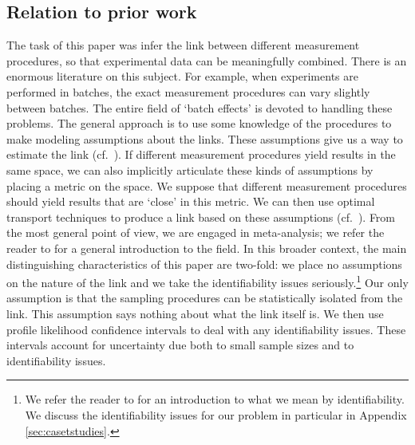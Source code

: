 \begin{itemize}
\section{Relation to prior work}

The task of this paper was infer the link between different measurement procedures, so that experimental data can be meaningfully combined.  There is an enormous literature on this subject.  For example, when experiments are performed in batches, the exact measurement procedures can vary slightly between batches.  The entire field of `batch effects' is devoted to handling these problems.  The general approach is to use some knowledge of the procedures to make modeling assumptions about the links.  These assumptions give us a way to estimate the link (cf.\ \cite{johnson2007adjusting}).  If different measurement procedures yield results in the same space, we can also implicitly articulate these kinds of assumptions by placing a metric on the space.  We suppose that different measurement procedures should yield results that are `close' in this metric.  We can then use optimal transport techniques to produce a link based on these assumptions (cf.\ \cite{tabak2018explanation}).  From the most general point of view, we are engaged in meta-analysis; we refer the reader to \cite{borenstein2011introduction} for a general introduction to the field.  In this broader context, the main distinguishing characteristics of this paper are two-fold: we place no assumptions on the nature of the link and we take the identifiability issues seriously.\footnote{We refer the reader to \cite{walter2014identifiability} for an introduction to what we mean by identifiability.  We discuss the identifiability issues for our problem in particular in Appendix \ref{sec:casetstudies}.}  Our only assumption is that the sampling procedures can be statistically isolated from the link.  This assumption says nothing about what the link itself is.  We then use profile likelihood confidence intervals to deal with any identifiability issues.  These intervals account for uncertainty due both to small sample sizes and to identifiability issues.


\end{itemize}
